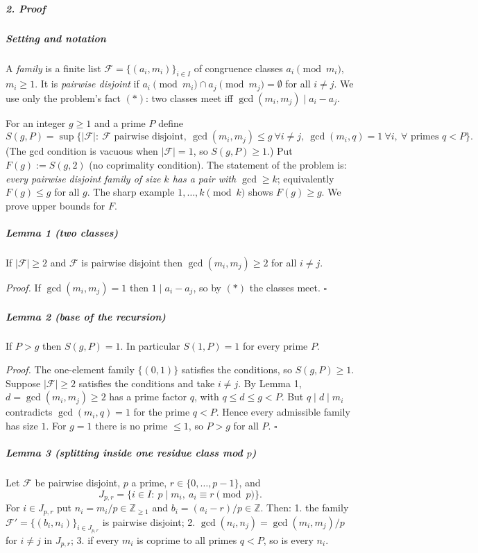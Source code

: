 \documentclass[11pt,a4paper]{article}
\begin{document}
\subparagraph{2. Proof}\label{proof}

\subparagraph{Setting and notation}\label{setting-and-notation}

A \emph{family} is a finite list \(\mathcal F=\{(a_i,m_i)\}_{i\in I}\)
of congruence classes \(a_i \pmod{m_i}\), \(m_i\ge 1\). It is
\emph{pairwise disjoint} if
\(a_i \pmod{m_i}\cap a_j\pmod{m_j}=\emptyset\) for all \(i\ne j\). We
use only the problem's fact \((*)\): two classes meet iff
\(\gcd(m_i,m_j)\mid a_i-a_j\).

For an integer \(g\ge 1\) and a prime \(P\) define
\[S(g,P)=\sup\Big\{|\mathcal F| :\ \mathcal F \text{ pairwise disjoint},\ \gcd(m_i,m_j)\le g\ \forall i\ne j,\ \gcd(m_i,q)=1\ \forall i,\ \forall \text{ primes } q<P\Big\}.\]
(The gcd condition is vacuous when \(|\mathcal F|=1\), so
\(S(g,P)\ge 1\).) Put \(F(g):=S(g,2)\) (no coprimality condition). The
statement of the problem is: \emph{every pairwise disjoint family of
size \(k\) has a pair with \(\gcd\ge k\)}; equivalently \(F(g)\le g\)
for all \(g\). The sharp example \(1,\dots,k \pmod k\) shows
\(F(g)\ge g\). We prove upper bounds for \(F\).

\subparagraph{Lemma 1 (two classes)}\label{lemma-1-two-classes}

If \(|\mathcal F|\ge 2\) and \(\mathcal F\) is pairwise disjoint then
\(\gcd(m_i,m_j)\ge 2\) for all \(i\ne j\).

\emph{Proof.} If \(\gcd(m_i,m_j)=1\) then \(1\mid a_i-a_j\), so by
\((*)\) the classes meet. \(\square\)

\subparagraph{Lemma 2 (base of the
recursion)}\label{lemma-2-base-of-the-recursion}

If \(P>g\) then \(S(g,P)=1\). In particular \(S(1,P)=1\) for every prime
\(P\).

\emph{Proof.} The one-element family \(\{(0,1)\}\) satisfies the
conditions, so \(S(g,P)\ge 1\). Suppose \(|\mathcal F|\ge 2\) satisfies
the conditions and take \(i\ne j\). By Lemma 1, \(d=\gcd(m_i,m_j)\ge 2\)
has a prime factor \(q\), with \(q\le d\le g<P\). But
\(q\mid d\mid m_i\) contradicts \(\gcd(m_i,q)=1\) for the prime \(q<P\).
Hence every admissible family has size \(1\). For \(g=1\) there is no
prime \(\le 1\), so \(P>g\) for all \(P\). \(\square\)

\subparagraph{\texorpdfstring{Lemma 3 (splitting inside one residue
class mod
\(p\))}{Lemma 3 (splitting inside one residue class mod p)}}\label{lemma-3-splitting-inside-one-residue-class-mod-p}

Let \(\mathcal F\) be pairwise disjoint, \(p\) a prime,
\(r\in\{0,\dots,p-1\}\), and
\[J_{p,r}=\{i\in I:\ p\mid m_i,\ a_i\equiv r \pmod p\}.\] For
\(i\in J_{p,r}\) put \(n_i=m_i/p\in\mathbb Z_{\ge1}\) and
\(b_i=(a_i-r)/p\in\mathbb Z\). Then: 1. the family
\(\mathcal F'=\{(b_i,n_i)\}_{i\in J_{p,r}}\) is pairwise disjoint; 2.
\(\gcd(n_i,n_j)=\gcd(m_i,m_j)/p\) for \(i\ne j\) in \(J_{p,r}\); 3. if
every \(m_i\) is coprime to all primes \(q<P\), so is every \(n_i\).
\end{document}
